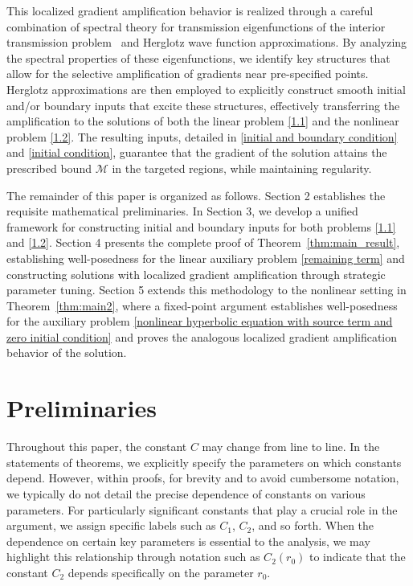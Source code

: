 \documentclass[11pt,reqno,oneside]{amsart}
\numberwithin{equation}{section}
\theoremstyle{definition}
\theoremstyle{remark}
\numberwithin{equation}{section}
\begin{document}
	This localized gradient amplification behavior is realized through a careful combination of spectral theory for transmission eigenfunctions of the interior transmission problem~\cite{ColtonKress} and Herglotz wave function approximations. By analyzing the spectral properties of these eigenfunctions, we identify key structures that allow for the selective amplification of gradients near pre-specified points. Herglotz approximations are then employed to explicitly construct smooth initial and/or boundary inputs that excite these structures, effectively transferring the amplification to the solutions of both the linear problem \eqref{1.1} and the nonlinear problem \eqref{1.2}. The resulting inputs, detailed in \eqref{initial and boundary condition} and \eqref{initial condition}, guarantee that the gradient of the solution attains the prescribed bound $\mathcal{M}$ in the targeted regions, while maintaining regularity.
	

    \fi 

	The remainder of this paper is organized as follows. Section 2 establishes the requisite mathematical preliminaries. In Section 3, we develop a unified framework for constructing initial and boundary inputs for both problems \eqref{1.1} and \eqref{1.2}. Section 4 presents the complete proof of Theorem~\ref{thm:main_result}, establishing well-posedness for the linear auxiliary problem \eqref{remaining term} and constructing solutions with localized gradient amplification through strategic parameter tuning. Section 5 extends this methodology to the nonlinear setting in Theorem~\ref{thm:main2}, where a fixed-point argument establishes well-posedness for the auxiliary problem \eqref{nonlinear hyperbolic equation with source term and zero initial condition} and proves the analogous localized gradient amplification behavior of the solution.
	
	
	
	\section{Preliminaries}
	
	Throughout this paper, the constant $C$ may change from line to line. In the statements of theorems, we explicitly specify the parameters on which constants depend. However, within proofs, for brevity and to avoid cumbersome notation, we typically do not detail the precise dependence of constants on various parameters. For particularly significant constants that play a crucial role in the argument, we assign specific labels such as $C_1$, $C_2$, and so forth. When the dependence on certain key parameters is essential to the analysis, we may highlight this relationship through notation such as $C_2(r_0)$ to indicate that the constant $C_2$ depends specifically on the parameter $r_0$.
\end{document}

